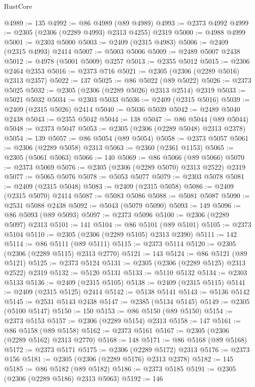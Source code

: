 \begin{lexlean}{RustCore}
\begin{coremodule}
@4989 := 135
@4992 := @86 @4989 (@89 @4989)
@4993 := @2373 @4992
@4999 := @2305 (@2306 (@2289 @4993) @2313 @4255) @2319
@5000 := @4988 @4999
@5001 := @2303 @5000
@5003 := @2409 (@2315 @4983)
@5006 := @2409 (@2315 @4993) @2414
@5007 := @5003 @5006
@5009 := @2489 @5007 @2438
@5012 := @4978 (@5001 @5009) @3257
@5013 := @2355 @5012
@5015 := @2306 @2464 @2353
@5016 := @2373 @716
@5021 := @2305 (@2306 (@2289 @5016) @2313 @2357)
@5022 := 137
@5025 := @86 @5022 (@89 @5022)
@5026 := @2373 @5025
@5032 := @2305 (@2306 (@2289 @5026) @2313 @2514) @2319
@5033 := @5021 @5032
@5034 := @2303 @5033
@5036 := @2409 (@2315 @5016)
@5039 := @2409 (@2315 @5026) @2414
@5040 := @5036 @5039
@5042 := @2489 @5040 @2438
@5043 := @2355 @5042
@5044 := 138
@5047 := @86 @5044 (@89 @5044)
@5048 := @2373 @5047
@5053 := @2305 (@2306 (@2289 @5048) @2313 @2378)
@5054 := 139
@5057 := @86 @5054 (@89 @5054)
@5058 := @2373 @5057
@5061 := @2306 (@2289 @5058) @2313
@5063 := @2360 (@2361 @1153)
@5065 := @2305 (@5061 @5063)
@5066 := 140
@5069 := @86 @5066 (@89 @5066)
@5070 := @2373 @5069
@5076 := @2305 (@2306 (@2289 @5070) @2313 @2522) @2319
@5077 := @5065 @5076
@5078 := @5053 @5077
@5079 := @2303 @5078
@5081 := @2409 (@2315 @5048)
@5083 := @2409 (@2315 @5058)
@5086 := @2409 (@2315 @5070) @2414
@5087 := @5083 @5086
@5088 := @5081 @5087
@5090 := @2531 @5088 @2438
@5092 := @5043 (@5079 @5090)
@5093 := 149
@5096 := @86 @5093 (@89 @5093)
@5097 := @2373 @5096
@5100 := @2306 (@2289 @5097) @2313
@5101 := 141
@5104 := @86 @5101 (@89 @5101)
@5105 := @2373 @5104
@5110 := @2305 (@2306 (@2289 @5105) @2313 @2390)
@5111 := 142
@5114 := @86 @5111 (@89 @5111)
@5115 := @2373 @5114
@5120 := @2305 (@2306 (@2289 @5115) @2313 @2770)
@5121 := 143
@5124 := @86 @5121 (@89 @5121)
@5125 := @2373 @5124
@5131 := @2305 (@2306 (@2289 @5125) @2313 @2522) @2319
@5132 := @5120 @5131
@5133 := @5110 @5132
@5134 := @2303 @5133
@5136 := @2409 (@2315 @5105)
@5138 := @2409 (@2315 @5115)
@5141 := @2409 (@2315 @5125) @2414
@5142 := @5138 @5141
@5143 := @5136 @5142
@5145 := @2531 @5143 @2438
@5147 := @2385 (@5134 @5145)
@5149 := @2305 (@5100 @5147)
@5150 := 150
@5153 := @86 @5150 (@89 @5150)
@5154 := @2373 @5153
@5157 := @2306 (@2289 @5154) @2313
@5158 := 147
@5161 := @86 @5158 (@89 @5158)
@5162 := @2373 @5161
@5167 := @2305 (@2306 (@2289 @5162) @2313 @2770)
@5168 := 148
@5171 := @86 @5168 (@89 @5168)
@5172 := @2373 @5171
@5175 := @2306 (@2289 @5172) @2313
@5176 := @2373 @156
@5181 := @2305 (@2306 (@2289 @5176) @2313 @2378)
@5182 := 145
@5185 := @86 @5182 (@89 @5182)
@5186 := @2373 @5185
@5191 := @2305 (@2306 (@2289 @5186) @2313 @5063)
@5192 := 146

\end{coremodule}
\end{lexlean}
